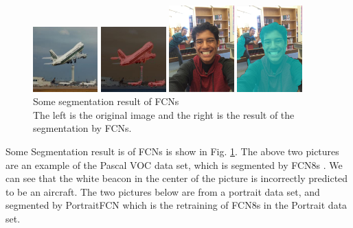 \begin{figure}[h]
    \centering
    \begin{minipage}[b]{2.5cm}
        \centering
        \includegraphics[width=2.5cm]{figs/Receptive_example_1_1.jpg}
        \caption*{a-1}
    \end{minipage}
    \mbox{\hspace{1cm}}
    \begin{minipage}[b]{2.5cm}
        \centering
        \includegraphics[width=2.5cm]{figs/Receptive_example_1_2.png}
        \caption*{a-2}
    \end{minipage}

    \begin{minipage}[b]{2.5cm}
        \centering
        \includegraphics[width=2.5cm]{figs/Receptive_example_2_1.png}
        \caption*{b-1}
    \end{minipage}
    \mbox{\hspace{1cm}}
    \begin{minipage}[b]{2.5cm}
        \centering
        \includegraphics[width=2.5cm]{figs/Receptive_example_2_2.png}
        \caption*{b-2}
    \end{minipage}
    \caption{Some segmentation result of FCNs \\ The left is the original image and the right is the result of the segmentation by FCNs.}
    \label{fig: Recveptive Example}
\end{figure}
Some Segmentation result is of FCNs is show in Fig. \ref{fig: Recveptive Example}. The above two pictures are an example of the Pascal VOC data set, which is segmented by FCN8s \cite{FCN-original:long2015fully}. We can see that the white beacon in the center of the picture is incorrectly predicted to be an aircraft. The two pictures below are from a portrait data set, and segmented by PortraitFCN \cite{FCN:segmentation:shen2016automatic} which is the retraining of FCN8s in the Portrait data set.

